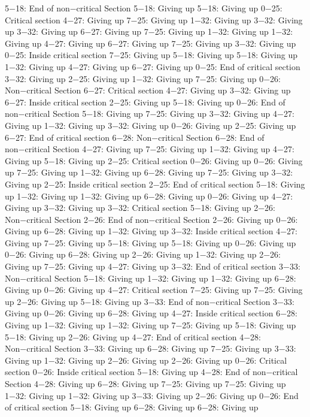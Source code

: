 5−18: End of non−critical Section
5−18: Giving up
5−18: Giving up
0−25: Critical section
4−27: Giving up
7−25: Giving up
1−32: Giving up
3−32: Giving up
3−32: Giving up
6−27: Giving up
7−25: Giving up
1−32: Giving up
1−32: Giving up
4−27: Giving up
6−27: Giving up
7−25: Giving up
3−32: Giving up
0−25: Inside critical section
7−25: Giving up
5−18: Giving up
5−18: Giving up
1−32: Giving up
4−27: Giving up
6−27: Giving up
0−25: End of critical section
3−32: Giving up
2−25: Giving up
1−32: Giving up
7−25: Giving up
0−26: Non−critical Section
6−27: Critical section
4−27: Giving up
3−32: Giving up
6−27: Inside critical section
2−25: Giving up
5−18: Giving up
0−26: End of non−critical Section
5−18: Giving up
7−25: Giving up
3−32: Giving up
4−27: Giving up
1−32: Giving up
3−32: Giving up
0−26: Giving up
2−25: Giving up
6−27: End of critical section
6−28: Non−critical Section
6−28: End of non−critical Section
4−27: Giving up
7−25: Giving up
1−32: Giving up
4−27: Giving up
5−18: Giving up
2−25: Critical section
0−26: Giving up
0−26: Giving up
7−25: Giving up
1−32: Giving up
6−28: Giving up
7−25: Giving up
3−32: Giving up
2−25: Inside critical section
2−25: End of critical section
5−18: Giving up
1−32: Giving up
1−32: Giving up
6−28: Giving up
0−26: Giving up
4−27: Giving up
3−32: Giving up
3−32: Critical section
5−18: Giving up
2−26: Non−critical Section
2−26: End of non−critical Section
2−26: Giving up
0−26: Giving up
6−28: Giving up
1−32: Giving up
3−32: Inside critical section
4−27: Giving up
7−25: Giving up
5−18: Giving up
5−18: Giving up
0−26: Giving up
0−26: Giving up
6−28: Giving up
2−26: Giving up
1−32: Giving up
2−26: Giving up
7−25: Giving up
4−27: Giving up
3−32: End of critical section
3−33: Non−critical Section
5−18: Giving up
1−32: Giving up
1−32: Giving up
6−28: Giving up
0−26: Giving up
4−27: Critical section
7−25: Giving up
7−25: Giving up
2−26: Giving up
5−18: Giving up
3−33: End of non−critical Section
3−33: Giving up
0−26: Giving up
6−28: Giving up
4−27: Inside critical section
6−28: Giving up
1−32: Giving up
1−32: Giving up
7−25: Giving up
5−18: Giving up
5−18: Giving up
2−26: Giving up
4−27: End of critical section
4−28: Non−critical Section
3−33: Giving up
6−28: Giving up
7−25: Giving up
3−33: Giving up
1−32: Giving up
2−26: Giving up
2−26: Giving up
0−26: Critical section
0−26: Inside critical section
5−18: Giving up
4−28: End of non−critical Section
4−28: Giving up
6−28: Giving up
7−25: Giving up
7−25: Giving up
1−32: Giving up
1−32: Giving up
3−33: Giving up
2−26: Giving up
0−26: End of critical section
5−18: Giving up
6−28: Giving up
6−28: Giving up
